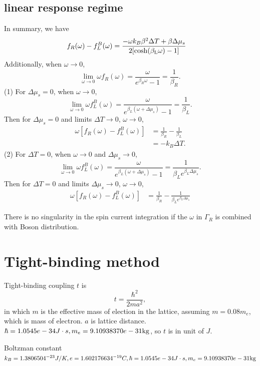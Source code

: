 \documentclass[aps,prb,onecolumn,amssymb,amsmath,superscriptaddress]{revtex4-1}
\begin{document}
\subsection{linear response regime}
In summary, we have
\begin{equation}
\begin{split}
f_{R}(\omega)-f_{L}^{B}(\omega) &= \frac{-\omega k_B\beta^2\Delta T + \beta\Delta\mu_s}{2[\rm{cosh}(\beta_{L}\omega)-1]}
\end{split}
\end{equation}
Additionally, when $\omega\to0$,
\[
\lim_{\omega\to0}\omega f_{R}(\omega) = \frac{\omega}{e^{\beta_{R}\omega}-1} = \frac{1}{\beta_R}.
\]
(1) For $\Delta\mu_s=0$, when $\omega\to0$,
\[
\lim_{\omega\to0}\omega f_{L}^{B}(\omega) = \frac{\omega}{e^{\beta_{L}(\omega+\Delta\mu_{s})}-1} = \frac{1}{\beta_L}.
\]
Then for $\Delta\mu_s=0$ and limits $\Delta T\to 0$, $\omega\to 0$,
\begin{equation}
\begin{split}
\omega[f_{R}(\omega)-f_{L}^{B}(\omega)] &= \frac{1}{\beta_R} - \frac{1}{\beta_L} \\
& = -k_B \Delta T.
\end{split}
\end{equation}
(2) For $\Delta T=0$, when $\omega\to0$ and $\Delta\mu_s\to 0$,
\[
\lim_{\omega\to0}\omega f_{L}^{B}(\omega) = \frac{\omega}{e^{\beta_{L}(\omega+\Delta\mu_{s})}-1} = \frac{1}{\beta_L e^{\beta_L \Delta\mu_s}}.
\]
Then for $\Delta T=0$ and limits $\Delta \mu_s\to 0$, $\omega\to 0$,
\begin{equation}
\begin{split}
\omega[f_{R}(\omega)-f_{L}^{B}(\omega)] &= \frac{1}{\beta_R} - \frac{1}{\beta_Le^{\beta_L \Delta\mu_s}} 
\end{split}
\end{equation}

There is no singularity in the spin current integration if the $\omega$ in $\Gamma_R$ is combined with Boson distribution.
\section{Tight-binding method}
Tight-binding coupling $t$ is 
\[
t = \frac{\hbar^{2}}{2ma^{2}},
\]
in which $m$ is the effective mass of election in the lattice, assuming $m=0.08m_{e}$, which is mass of electron. $a$ is lattice distance. $\hbar = 1.0545e-34J\cdot s, m_e = 9.10938370e-31\rm{kg}$, so $t$ is in unit of $J$.

Boltzman constant $k_B = 1.3806504^{-23}J/K, e = 1.602176634^{-19}C, \hbar = 1.0545e-34J\cdot s, m_e = 9.10938370e-31\rm{kg}$
\end{document}

